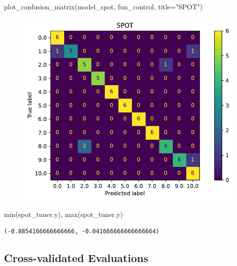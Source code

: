 \documentclass[
  letterpaper,
  DIV=11,
  numbers=noendperiod]{scrreprt}
\newenvironment{Shaded}{\begin{snugshade}}{\end{snugshade}}
\newcommand{\BuiltInTok}[1]{\textcolor[rgb]{0.00,0.23,0.31}{#1}}
\newcommand{\NormalTok}[1]{\textcolor[rgb]{0.00,0.23,0.31}{#1}}
\newcommand{\OperatorTok}[1]{\textcolor[rgb]{0.37,0.37,0.37}{#1}}
\newcommand{\StringTok}[1]{\textcolor[rgb]{0.13,0.47,0.30}{#1}}
\begin{document}
\begin{Shaded}
\begin{Highlighting}[]
\NormalTok{plot\_confusion\_matrix(model\_spot, fun\_control, title}\OperatorTok{=}\StringTok{"SPOT"}\NormalTok{)}
\end{Highlighting}
\end{Shaded}

\begin{figure}[H]

{\centering \includegraphics{18_spot_hpt_sklearn_multiclass_classification_svc_files/figure-pdf/cell-42-output-1.pdf}

}

\end{figure}

\begin{Shaded}
\begin{Highlighting}[]
\BuiltInTok{min}\NormalTok{(spot\_tuner.y), }\BuiltInTok{max}\NormalTok{(spot\_tuner.y)}
\end{Highlighting}
\end{Shaded}

\begin{verbatim}
(-0.8854166666666666, -0.041666666666666664)
\end{verbatim}

\hypertarget{cross-validated-evaluations-2}{%
\subsection{Cross-validated
Evaluations}\label{cross-validated-evaluations-2}}
\end{document}
